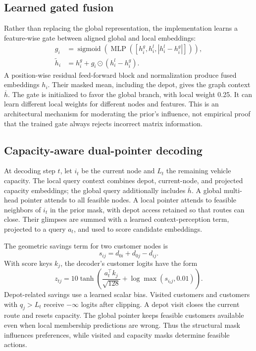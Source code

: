\documentclass[11pt,a4paper]{article}
\begin{document}
\subsection{Learned gated fusion}

Rather than replacing the global representation, the implementation
learns a feature-wise gate between aligned global and local embeddings:
\begin{align}
 g_i&=\operatorname{sigmoid}\!\left(
       \operatorname{MLP}([h_i^g,h_i^l,|h_i^l-h_i^g|])\right),\\
 \widetilde h_i&=h_i^g+g_i\odot(h_i^l-h_i^g).
 \label{eq:fusion}
\end{align}
A position-wise residual feed-forward block and normalization produce
fused embeddings $h_i$. Their masked mean, including the depot, gives
the graph context $\overline h$. The gate is initialized to favor the
global branch, with local weight 0.25. It can learn different local
weights for different nodes and features. This is an architectural
mechanism for moderating the prior's influence, not empirical proof that
the trained gate always rejects incorrect matrix information.

\subsection{Capacity-aware dual-pointer decoding}

At decoding step $t$, let $i_t$ be the current node and $L_t$ the remaining
vehicle capacity. The local query context combines depot, current-node,
and projected capacity embeddings; the global query additionally includes
$\overline h$. A global multi-head pointer attends to all feasible nodes.
A local pointer attends to feasible neighbors of $i_t$ in the prior mask,
with depot access retained so that routes can close. Their glimpses are
summed with a learned context-perception term, projected to a query $a_t$,
and used to score candidate embeddings.

The geometric savings term for two customer nodes is
\begin{equation}
 s_{ij}=d_{0i}+d_{0j}-d_{ij}.
 \label{eq:savings}
\end{equation}
With score keys $k_j$, the decoder's customer logits have the form
\begin{equation}
 z_{tj}=10\tanh\!\left(
       \frac{a_t^\top k_j}{\sqrt{128}}
       +\log\max(s_{i_tj},0.01)\right).
 \label{eq:decoder-logit}
\end{equation}
Depot-related savings use a learned scalar bias. Visited customers and
customers with $q_j>L_t$ receive $-\infty$ logits after clipping.
A depot visit closes the current route and resets capacity. The global
pointer keeps feasible customers available even when local membership
predictions are wrong. Thus the structural mask influences preferences,
while visited and capacity masks determine feasible actions.
\end{document}
